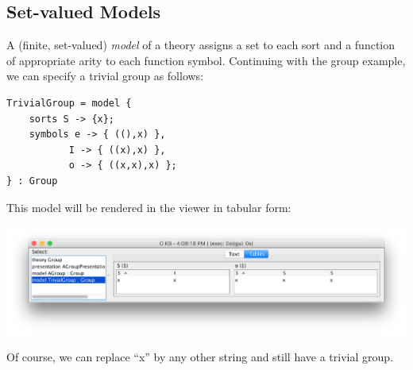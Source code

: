 \documentclass[12pt]{article}
\begin{document}
\subsection{Set-valued Models}

A (finite, set-valued) {\it model} of a theory assigns a set to each sort and a function of appropriate arity to each function symbol.  Continuing with the group example, we can specify a trivial group as follows:
\begin{verbatim}
TrivialGroup = model {
	sorts S -> {x};
	symbols e -> { ((),x) },
		   I -> { ((x),x) },
		   o -> { ((x,x),x) };
} : Group 
\end{verbatim}
This model will be rendered in the viewer in tabular form:
\begin{center}
\includegraphics[width=6in]{group2}
\end{center}
Of course, we can replace ``x'' by any other string and still have a trivial group.
\end{document}
